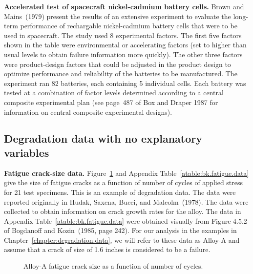 \begin{example}
\label{example:spacecraft.battery}
{\bf Accelerated test of spacecraft nickel-cadmium battery cells.}
Brown and Mains~(1979) present the results of an extensive experiment
to evaluate the long-term performance of rechargable nickel-cadmium
battery cells that were to be used in spacecraft. The study used 8
experimental factors. The first five factors shown in the table were
environmental or accelerating factors (set to higher than usual levels
to obtain failure information more quickly).  The other three factors
were product-design factors that could be adjusted in the product
design to optimize performance and reliability of the batteries to be
manufactured.  The experiment ran 82 batteries, each containing 5
individual cells.  Each battery was tested at a combination of factor
levels determined according to a central composite experimental plan
(see page~487 of Box and Draper 1987 for information on central
composite experimental designs).
\end{example}

\subsection{Degradation data with no explanatory variables}
\label{section:degradation.with.no.exp}

\begin{example}
\label{example:bk.fatigue.data}
{\bf Fatigue crack-size data.} Figure~\ref{figure:bk.fatigue.data.ps}
and Appendix Table~\ref{atable:bk.fatigue.data} give the size of
fatigue cracks as a function of number of cycles of applied stress for
21 test specimens. This is an example of degradation data.  The data
were reported originally in Hudak, Saxena, Bucci, and Malcolm~(1978).
The data were collected to obtain information on crack growth rates
for the alloy. The data in Appendix Table~\ref{atable:bk.fatigue.data}
were obtained visually from Figure 4.5.2 of Bogdanoff and Kozin~(1985,
page 242).  For our analysis in the examples in
Chapter~\ref{chapter:degradation.data}, we will refer to these data as
Alloy-A and assume that a crack of size of 1.6 inches is considered to
be a failure.
\begin{figure}
\caption{Alloy-A fatigue crack size as a function of number of cycles.}
\label{figure:bk.fatigue.data.ps}
\end{figure}
\end{example}



